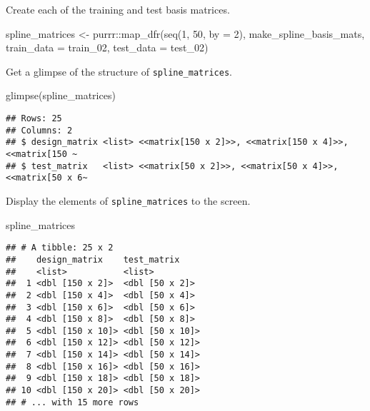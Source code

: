 \documentclass[
]{article}
\newenvironment{Shaded}{\begin{snugshade}}{\end{snugshade}}
\newcommand{\AttributeTok}[1]{\textcolor[rgb]{0.77,0.63,0.00}{#1}}
\newcommand{\DecValTok}[1]{\textcolor[rgb]{0.00,0.00,0.81}{#1}}
\newcommand{\FunctionTok}[1]{\textcolor[rgb]{0.00,0.00,0.00}{#1}}
\newcommand{\NormalTok}[1]{#1}
\newcommand{\OtherTok}[1]{\textcolor[rgb]{0.56,0.35,0.01}{#1}}
\newcommand{\SpecialCharTok}[1]{\textcolor[rgb]{0.00,0.00,0.00}{#1}}
\begin{document}
Create each of the training and test basis matrices.

\begin{Shaded}
\begin{Highlighting}[]
\NormalTok{spline\_matrices }\OtherTok{\textless{}{-}}\NormalTok{ purrr}\SpecialCharTok{::}\FunctionTok{map\_dfr}\NormalTok{(}\FunctionTok{seq}\NormalTok{(}\DecValTok{1}\NormalTok{, }\DecValTok{50}\NormalTok{, }\AttributeTok{by =} \DecValTok{2}\NormalTok{), }
\NormalTok{                                  make\_spline\_basis\_mats,}
                                  \AttributeTok{train\_data =}\NormalTok{ train\_02, }
                                  \AttributeTok{test\_data =}\NormalTok{ test\_02)}
\end{Highlighting}
\end{Shaded}

Get a glimpse of the structure of \texttt{spline\_matrices}.

\begin{Shaded}
\begin{Highlighting}[]
\FunctionTok{glimpse}\NormalTok{(spline\_matrices)}
\end{Highlighting}
\end{Shaded}

\begin{verbatim}
## Rows: 25
## Columns: 2
## $ design_matrix <list> <<matrix[150 x 2]>>, <<matrix[150 x 4]>>, <<matrix[150 ~
## $ test_matrix   <list> <<matrix[50 x 2]>>, <<matrix[50 x 4]>>, <<matrix[50 x 6~
\end{verbatim}

Display the elements of \texttt{spline\_matrices} to the screen.

\begin{Shaded}
\begin{Highlighting}[]
\NormalTok{spline\_matrices}
\end{Highlighting}
\end{Shaded}

\begin{verbatim}
## # A tibble: 25 x 2
##    design_matrix    test_matrix    
##    <list>           <list>         
##  1 <dbl [150 x 2]>  <dbl [50 x 2]> 
##  2 <dbl [150 x 4]>  <dbl [50 x 4]> 
##  3 <dbl [150 x 6]>  <dbl [50 x 6]> 
##  4 <dbl [150 x 8]>  <dbl [50 x 8]> 
##  5 <dbl [150 x 10]> <dbl [50 x 10]>
##  6 <dbl [150 x 12]> <dbl [50 x 12]>
##  7 <dbl [150 x 14]> <dbl [50 x 14]>
##  8 <dbl [150 x 16]> <dbl [50 x 16]>
##  9 <dbl [150 x 18]> <dbl [50 x 18]>
## 10 <dbl [150 x 20]> <dbl [50 x 20]>
## # ... with 15 more rows
\end{verbatim}
\end{document}
